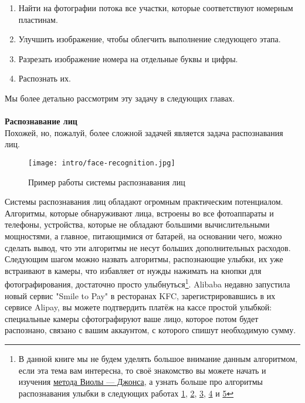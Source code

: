 \begin{enumerate}
    \item Найти на фотографии потока все участки, которые соответствуют номерным пластинам.
    \item Улучшить изображение, чтобы облегчить выполнение следующего этапа.
    \item Разрезать изображение номера на отдельные буквы и цифры.
    \item Распознать их.\\
\end{enumerate}

Мы более детально рассмотрим эту задачу в следующих главах.\\\\

\textbf{Распознавание лиц}\\
Похожей, но, пожалуй, более сложной задачей является задача распознавания лиц.\\

\begin{figure}[H]
    \centering
    \texttt{[image: intro/face-recognition.jpg]}
    \caption{Пример работы системы распознавания лиц}
\end{figure}

Системы распознавания лиц обладают огромным практическим потенциалом. Алгоритмы, которые обнаруживают лица, встроены во все фотоаппараты и телефоны, устройства, которые не обладают большими вычислительными мощностями, а главное, питающимися от батарей, на основании чего, можно сделать вывод, что эти алгоритмы не несут больших дополнительных расходов. Следующим шагом можно назвать алгоритмы, распознающие улыбки, их уже встраивают в камеры, что избавляет от нужды нажимать на кнопки для фотографирования, достаточно просто улыбнуться\footnote{В данной книге мы не будем уделять большое внимание данным алгоритмом, если эта тема вам интересна, то своё знакомство вы можете начать и изучения \href{https://ru.wikipedia.org/wiki/\%D0\%9C\%D0\%B5\%D1\%82\%D0\%BE\%D0\%B4_\%D0\%92\%D0\%B8\%D0\%BE\%D0\%BB\%D1\%8B_\%E2\%80\%94_\%D0\%94\%D0\%B6\%D0\%BE\%D0\%BD\%D1\%81\%D0\%B0}{метода Виолы — Джонса}, а узнать больше про алгоритмы распознавания улыбки в следующих работах \href{https://arxiv.org/abs/1602.00172}{1}, \href{https://www.researchgate.net/publication/283095914_Automatic_smile_recognition_from_face_images}{2}, \href{https://ieeexplore.ieee.org/document/7018058/}{3}, \href{http://flothesof.github.io/smile-recognition.html}{4} и \href{https://github.com/aquibjaved/Real-time-Smile-Recognition}{5}}. Alibaba недавно запустила новый сервис "Smile to Pay" в ресторанах KFC, зарегистрировавшись в их сервисе Alipay, вы можете подтвердить платёж на кассе простой улыбкой: специальные камеры сфотографируют ваше лицо, которое потом будет распознано, связано с вашим аккаунтом, с которого спишут необходимую сумму\cite{smile-to-pay}.\\

